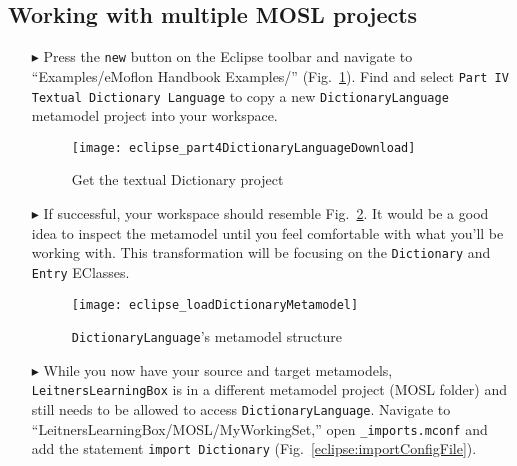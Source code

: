 \newpage
\hypertarget{multiMOSL}{}
\subsection{Working with multiple MOSL projects}
\texHeader

\begin{itemize}

\item[$\blacktriangleright$] Press the \texttt{new} button on the Eclipse toolbar and navigate to ``Examples/eMoflon Handbook Examples/''
(Fig.~\ref{eclipse:dictionaryDownloadWizard}). Find and select \texttt{Part IV Textual Dictionary Language} to copy a new \texttt{Dict\-ion\-ary\-Lang\-uage}
metamodel project into your workspace.

\vspace{0.5cm}

\begin{figure}[htbp]
\begin{center}
  \texttt{[image: eclipse\_part4DictionaryLanguageDownload]}
  \caption{Get the textual Dictionary project}
  \label{eclipse:dictionaryDownloadWizard}
\end{center}
\end{figure}

\item[$\blacktriangleright$] If successful, your workspace should resemble Fig.~\ref{eclipse:loadedDictionaryMetamodel}. It would be a good idea to inspect the
metamodel until you feel comfortable with what you'll be working with. This transformation will be focusing on the \texttt{Dictionary} and \texttt{Entry}
EClasses.

\newpage

\begin{figure}[htbp]
\begin{center}
  \texttt{[image: eclipse\_loadDictionaryMetamodel]}
  \caption{\texttt{DictionaryLanguage}'s metamodel structure}
  \label{eclipse:loadedDictionaryMetamodel}
\end{center}
\end{figure}

\item[$\blacktriangleright$] While you now have your source and target metamodels, \texttt{Leit\-ners\-Learn\-ing\-Box} is in a different metamodel project
(MOSL folder) and still needs to be allowed to access \texttt{Dict\-ion\-ary\-Lang\-uage}. Navigate to ``LeitnersLearningBox/MOSL/MyWorkingSet,'' open
\texttt{\_imports.mconf} and add the statement \texttt{import Dictionary} (Fig.~\ref{eclipse:importConfigFile}).


\end{itemize}
